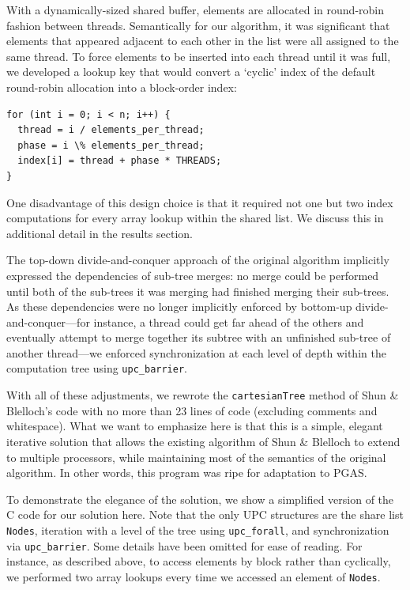 \documentclass[10pt]{article}
\begin{document}
With a dynamically-sized shared buffer, elements are allocated in round-robin fashion between threads.
Semantically for our algorithm, it was significant that elements that appeared adjacent to each
other in the list were all assigned to the same thread.
To force elements to be inserted into each thread until it was full, we developed a lookup key that
would convert a `cyclic' index of the default round-robin allocation into a block-order index:

\begin{minipage}{\linewidth}
\begin{lstlisting}
for (int i = 0; i < n; i++) {
  thread = i / elements_per_thread;
  phase = i \% elements_per_thread;
  index[i] = thread + phase * THREADS;
}
\end{lstlisting}
\end{minipage}

One disadvantage of this design choice is that it required not one but two index computations
for every array lookup within the shared list.
We discuss this in additional detail in the results section.

The top-down divide-and-conquer approach of the original algorithm implicitly expressed the
dependencies of sub-tree merges:
no merge could be performed until both of the sub-trees it was merging had finished merging
their sub-trees.
As these dependencies were no longer implicitly enforced by bottom-up divide-and-conquer---for
instance, a thread could get far ahead of the others and eventually attempt to merge together its
subtree with an unfinished sub-tree of another thread---we enforced synchronization at each
level of depth within the computation tree using \texttt{upc\_barrier}.

With all of these adjustments, we rewrote the \texttt{cartesianTree} method of Shun \& Blelloch's
code with no more than 23 lines of code (excluding comments and whitespace).
What we want to emphasize here is that this is a simple, elegant iterative solution that allows
the existing algorithm of Shun \& Blelloch to extend to multiple processors, while maintaining
most of the semantics of the original algorithm.
In other words, this program was ripe for adaptation to PGAS.

To demonstrate the elegance of the solution, we show a simplified version of the C code for
our solution here.
Note that the only UPC structures are the share list \texttt{Nodes}, iteration with a level
of the tree using \texttt{upc\_forall}, and synchronization via \texttt{upc\_barrier}.
Some details have been omitted for ease of reading.
For instance, as described above, to access elements by block rather than cyclically, we performed
two array lookups every time we accessed an element of \texttt{Nodes}.
\end{document}
